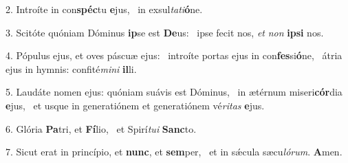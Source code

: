 2. Introíte in con\textbf{spéc}tu \textbf{e}jus, \ast\  in exsul\textit{ta}\textit{ti}\textbf{ó}ne.\

3. Scitóte quóniam Dóminus \textbf{ip}se est \textbf{De}us: \ast\  ipse fecit nos, \textit{et} \textit{non} \textbf{ip}\textbf{si} nos.\

4. Pópulus ejus, et oves páscuæ ejus: \dag\  introíte portas ejus in con\textbf{fes}si\textbf{ó}ne, \ast\  átria ejus in hymnis: confité\textit{mi}\textit{ni} \textbf{il}li.\

5. Laudáte nomen ejus: quóniam suávis est Dóminus, \dag\  in ætérnum miseri\textbf{cór}dia \textbf{e}jus, \ast\  et usque in generatiónem et generatiónem vé\textit{ri}\textit{tas} \textbf{e}jus.\

6. Glória \textbf{Pa}tri, et \textbf{Fí}lio, \ast\  et Spirí\textit{tu}\textit{i} \textbf{Sanc}to.\

7. Sicut erat in princípio, et \textbf{nunc}, et \textbf{sem}per, \ast\  et in sǽcula sæcu\textit{ló}\textit{rum}. \textbf{A}men.\

